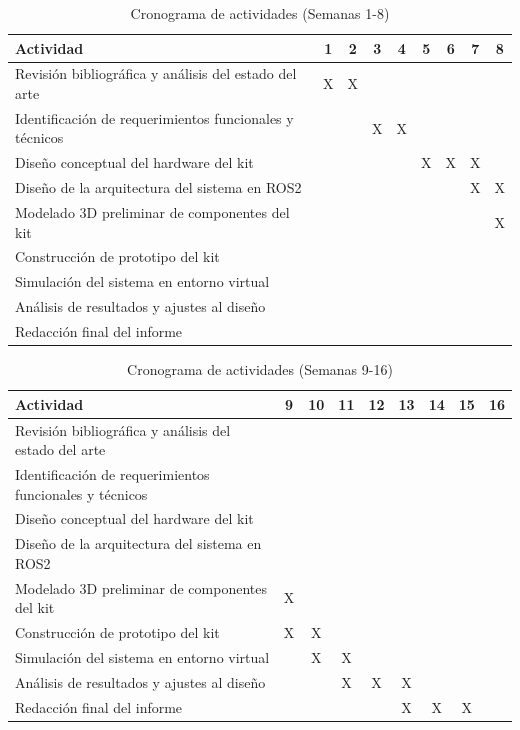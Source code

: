\begin{table}[H]
\centering
\caption{Cronograma de actividades (Semanas 1-8)}
\label{tab:cronograma_1}
\footnotesize
\begin{tabular}{|p{6cm}|c|c|c|c|c|c|c|c|}
\hline
\textbf{Actividad} & \textbf{1} & \textbf{2} & \textbf{3} & \textbf{4} & \textbf{5} & \textbf{6} & \textbf{7} & \textbf{8} \\
\hline
Revisión bibliográfica y análisis del estado del arte & X & X & & & & & & \\
\hline
Identificación de requerimientos funcionales y técnicos & & & X & X & & & & \\
\hline
Diseño conceptual del hardware del kit & & & & & X & X & X & \\
\hline
Diseño de la arquitectura del sistema en ROS2 & & & & & & & X & X \\
\hline
Modelado 3D preliminar de componentes del kit & & & & & & & & X \\
\hline
Construcción de prototipo del kit & & & & & & & & \\
\hline
Simulación del sistema en entorno virtual & & & & & & & & \\
\hline
Análisis de resultados y ajustes al diseño & & & & & & & & \\
\hline
Redacción final del informe & & & & & & & & \\
\hline
\end{tabular}
\end{table}

\begin{table}[H]
\centering
\caption{Cronograma de actividades (Semanas 9-16)}
\label{tab:cronograma_2}
\footnotesize
\begin{tabular}{|p{6cm}|c|c|c|c|c|c|c|c|}
\hline
\textbf{Actividad} & \textbf{9} & \textbf{10} & \textbf{11} & \textbf{12} & \textbf{13} & \textbf{14} & \textbf{15} & \textbf{16} \\
\hline
Revisión bibliográfica y análisis del estado del arte & & & & & & & & \\
\hline
Identificación de requerimientos funcionales y técnicos & & & & & & & & \\
\hline
Diseño conceptual del hardware del kit & & & & & & & & \\
\hline
Diseño de la arquitectura del sistema en ROS2 & & & & & & & & \\
\hline
Modelado 3D preliminar de componentes del kit & X & & & & & & & \\
\hline
Construcción de prototipo del kit & X & X & & & & & & \\
\hline
Simulación del sistema en entorno virtual & & X & X & & & & & \\
\hline
Análisis de resultados y ajustes al diseño & & & X & X & X & & & \\
\hline
Redacción final del informe & & & & & X & X & X & \\
\hline
\end{tabular}
\end{table}